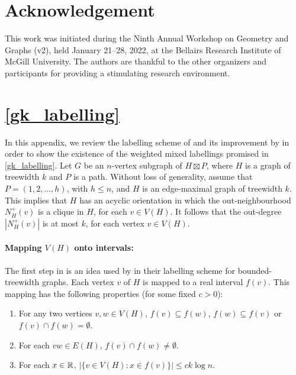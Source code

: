 \documentclass{patmorin}
\renewcommand{\le}{\leqslant}
\newcommand{\defin}[1]{\emph{\textcolor{brightmaroon}{#1}}}
\begin{document}
\section*{Acknowledgement}
This work was initiated during the Ninth Annual Workshop on Geometry and Graphs (v2), held January 21--28, 2022, at the Bellairs Research Institute of McGill University.  The authors are thankful to the other organizers and participants for providing a stimulating research environment.



\setlength{\bibsep}{0.3ex plus 0.1ex minus 0.1ex}



  \appendix

\section{\cref{gk_labelling}}
  \label{weighted_product_proof}

  In this appendix, we review the labelling scheme of \citet{dujmovic.esperet.ea:adjacency} and its improvement by \citet{gawrychowski.janczewski:simpler} in order to show the existence of the weighted mixed labellings promised in \cref{gk_labelling}.
  Let $G$ be an $n$-vertex subgraph of $H\boxtimes P$, where $H$ is a graph of treewidth $k$ and $P$ is a path. Without loss of generality, assume that $P=(1,2,\dots,h)$, with $h\le n$, and $H$ is an edge-maximal graph of treewidth $k$.  This implies that $H$ has an acyclic orientation in which the out-neighbourhood $N^+_H(v)$ is a clique in $H$, for each $v\in V(H)$.
  It follows that the out-degree $|N^+_H(v)|$ is at most $k$, for each vertex $v\in V(H)$.

  \paragraph{\boldmath Mapping $V(H)$ onto intervals:}
  The first step in \cite{dujmovic.esperet.ea:adjacency} is an idea used by \citet{gavoille.labourel:shorter} in their labelling scheme for bounded-treewidth graphs.
  Each vertex $v$ of $H$ is mapped to a real interval \defin{$f(v)$}.
  This mapping has the following properties (for some fixed $c>0$):
  \begin{enumerate}[nosep,label=(I\arabic*)]
      \item\label{nested_or_disjoint} For any two vertices $v,w\in V(H)$, $f(v)\subseteq f(w)$, $f(w)\subseteq f(v)$ or $f(v)\cap f(w)=\emptyset$.
      \item\label{intersection_subgraph} For each $vw\in E(H)$, $f(v)\cap f(w)\neq\emptyset$.
      \item\label{thin} For each $x\in \mathbb{R}$, $|\{v\in V(H):x\in f(v)\}|\le ck\log n$.
  \end{enumerate}
\end{document}
